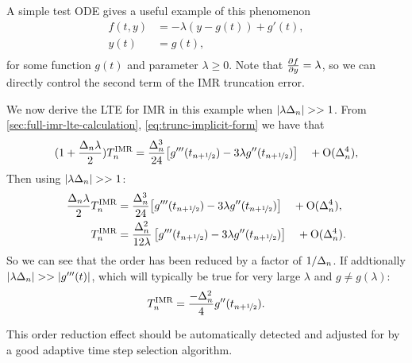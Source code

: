 A simple test ODE gives a useful example of this phenomenon \cite[157]{Atkinson2009}
\begin{equation}
  \label{eqn:imr-test-order-reduction}
  \begin{aligned}
    f(t, y) &= -\lambda (y - g(t)) + g'(t), \\
    y(t) &= g(t), \\
  \end{aligned}
\end{equation}
for some function $g(t)$ and parameter $\lambda \geq 0$.
Note that $\frac{\partial f}{\partial y} = \lambda$, so we can directly control the second term of the IMR truncation error.

We now derive the LTE for IMR in this example when $\left|{\lambda\Delta_{n}} \right| >> 1$.
From \autoref{sec:full-imr-lte-calculation}, \eqref{eq:trunc-implicit-form} we have that
\begin{equation}
  \begin{aligned}
    (1 + \frac{\Delta_{n} \lambda}{2})T_n^{\text{IMR}} &= \frac{\Delta_{n}^3}{24}
    {\left[ g'''(t_{n+\nicefrac{1}{2}}) - 3 \lambda g''(t_{n+\nicefrac{1}{2}}) \right]} \quad + \text{O}(\Delta_{n}^4), \\ 
  \end{aligned}
\end{equation}
Then using $\left|{\lambda\Delta_{n}} \right| >> 1$:
\begin{equation}
  \begin{aligned}
    \frac{\Delta_{n} \lambda}{2} T_n^{\text{IMR}} &= \frac{\Delta_{n}^3}{24}
    {\left[ g'''(t_{n+\nicefrac{1}{2}}) - 3 \lambda g''(t_{n+\nicefrac{1}{2}}) \right]} \quad + \text{O}(\Delta_{n}^4), \\ 
    T_n^{\text{IMR}} &= \frac{\Delta_{n}^2}{12\lambda} \left[g'''(t_{n+\nicefrac{1}{2}}) - 3 \lambda g''(t_{n+\nicefrac{1}{2}}) \right] \quad + \text{O}(\Delta_{n}^4).
  \end{aligned}
\end{equation}
So we can see that the order has been reduced by a factor of $1/\Delta_{n}$.
If addtionally $\left|{\lambda\Delta_{n}} \right| >> \left|{g'''(t)} \right|$, which will typically be true for very large $\lambda$ and $g \neq g(\lambda)$:
\begin{equation}
  T_n^{\text{IMR}} = \frac{-\Delta_{n}^2}{4} g''(t_{n+\nicefrac{1}{2}}).
  \label{eq:reduced-order-imr-truncation-error}
\end{equation}

This order reduction effect should be automatically detected and adjusted for by a good adaptive time step selection algorithm.





